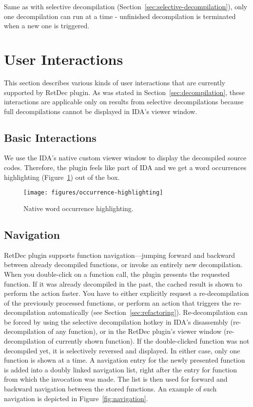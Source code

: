 \documentclass[pdftex, a4paper,12pt, oneside, svgnames]{article}
\begin{document}
Same as with selective decompilation (Section~\ref{sec:selective-decompilation}), only one decompilation can run at a time - unfinished decompilation is terminated when a new one is triggered.

\section{User Interactions}
\label{sec:user-interactions}
This section describes various kinds of user interactions that are currently supported by RetDec plugin. As was stated in Section~\ref{sec:decompilation}, these interactions are applicable only on results from selective decompilations because full decompilations cannot be displayed in IDA's viewer window.

\subsection{Basic Interactions}
We use the IDA's native custom viewer window to display the decompiled source codes. Therefore, the plugin feels like part of IDA and we get a word occurrences highlighting (Figure~\ref{fig:occurrence-highlighting}) out of the box.

\begin{figure}[!ht]
	\centering
	\texttt{[image: figures/occurrence-highlighting]}
	\caption{Native word occurrence highlighting.}
	\label{fig:occurrence-highlighting}
\end{figure}

\subsection{Navigation}
\label{sec:navigation}
RetDec plugin supports function navigation---jumping forward and backward between already decompiled functions, or invoke an entirely new decompilation. When you double-click on a function call, the plugin presents the requested function. If it was already decompiled in the past, the cached result is shown to perform the action faster. You have to either explicitly request a re-decompilation of the previously processed functions, or perform an action that triggers the re-decompilation automatically (see Section~\ref{sec:refactoring}). Re-decompilation can be forced by using the selective decompilation hotkey in IDA's disassembly (re-decompilation of any function), or in the RetDec plugin's viewer window (re-decompilation of currently shown function). If the double-clicked function was not decompiled yet, it is selectively reversed and displayed. In either case, only one function is shown at a time. A navigation entry for the newly presented function is added into a doubly linked navigation list, right after the entry for function from which the invocation was made. The list is then used for forward and backward navigation between the stored functions. An example of such navigation is depicted in Figure~\ref{fig:navigation}.
\end{document}
